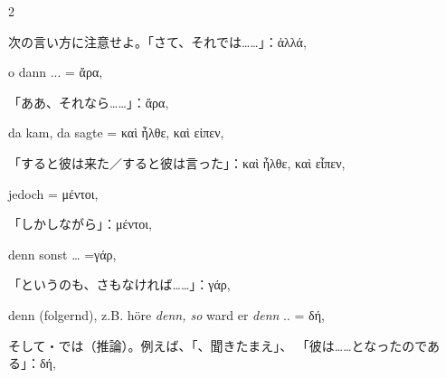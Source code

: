 \begin{paracol}{2}
\begin{enumerate}[leftmargin=0pt,rightmargin=0pt,listparindent =1cm,labelindent=1cm,labelsep=1ex,labelwidth={*},itemindent={*},align=left]
\begin{japanese}
次の言い方に注意せよ。「さて、それでは……」：\textgreek[variant=ancient]{ἀλλά,}
\end{japanese}
\switchcolumn*

\bgroup\addtolength{\leftskip}{\parindent}\addtolength{\leftskip}{3em}\setlength{\parindent}{-1em}\setlength{\arraycolsep}{0pt}%
\begin{german}
o dann ... = \textgreek[variant=ancient]{ἄρα,}
\end{german}
\switchcolumn

\begin{japanese}
「ああ、それなら……」：\textgreek[variant=ancient]{ἄρα,}
\end{japanese}
\switchcolumn*

\begin{german}
da kam, da sagte = \textgreek[variant=ancient]{καὶ ἦλθε, καὶ εἰπεν,}
\end{german}
\switchcolumn

\begin{japanese}
「すると彼は来た／すると彼は言った」：\textgreek[variant=ancient]{καὶ ἦλθε, καὶ εἶπεν,}
\end{japanese}
\switchcolumn*

\begin{german}
jedoch = \textgreek[variant=ancient]{μέντοι,}
\end{german}
\switchcolumn

\begin{japanese}
「しかしながら」：\textgreek[variant=ancient]{μέντοι,}
\end{japanese}
\switchcolumn*

\begin{german}
denn sonst \ldots{} =\textgreek[variant=ancient]{γάρ,}
\end{german}
\switchcolumn

\begin{japanese}
「というのも、さもなければ……」：\textgreek[variant=ancient]{γάρ,}
\end{japanese}
\switchcolumn*

\begin{german}
denn (folgernd), z.B. höre \emph{denn, so} ward er \emph{denn} ..
= \textgreek[variant=ancient]{δή,}
\end{german}
\switchcolumn

\begin{japanese}
そして・では（推論）。例えば、「、聞きたまえ」、
「彼は……となったのである」：\textgreek[variant=ancient]{δή,}
\end{japanese}
\switchcolumn*


\end{enumerate}
\end{paracol}
